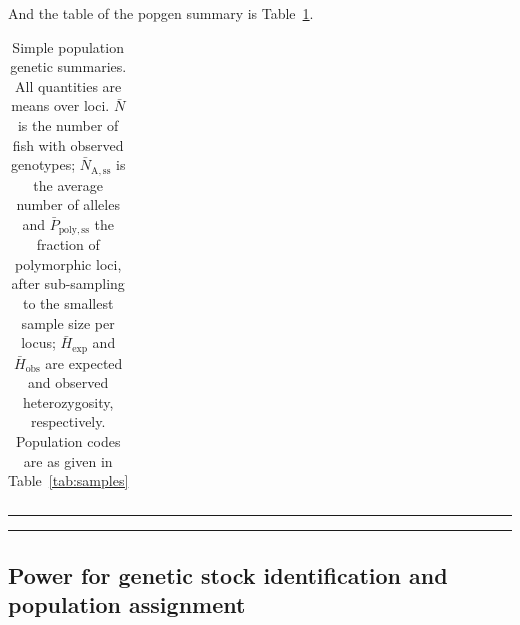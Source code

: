 And the table of the popgen summary is Table~\ref{tab:pg-summ}.
\begin{table}
\caption{\footnotesize Simple population genetic summaries. All quantities are means
over loci.  $\bar{N}$ is the number of fish with observed genotypes; $\bar{N}_\mathrm{A,ss}$ is the
average number of alleles and $\bar{P}_\mathrm{poly,ss}$ the fraction of polymorphic loci,
after sub-sampling to the smallest sample size per locus; $\bar{H}_\mathrm{exp}$ and
$\bar{H}_\mathrm{obs}$ are expected and observed heterozygosity, respectively. Population
codes are as given in Table~\ref{tab:samples}}
\label{tab:pg-summ}
{\footnotesize
\begin{tabular*}{\columnwidth}{@{\extracolsep{\fill}} lrrrrr}
\hline\hline

\end{tabular*}
}
\vspace*{-2.3ex}\hrule\vspace*{0.3ex}\hrule
\end{table}



\subsection*{Power for genetic stock identification and population assignment}

